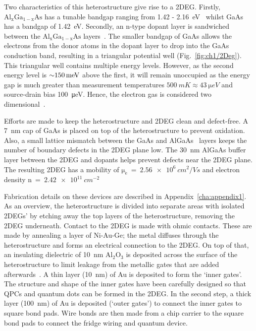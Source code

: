 Two characteristics of this heterostructure give rise to a 2DEG. Firstly, $\mathrm{Al_xGa_{1-x}As}$ has a tunable bandgap ranging from 1.42 - \qty{2.16}{eV}~\cite{gaas_overview} whilst GaAs has a bandgap of \qty{1.42}{eV}. Secondly, an n-type dopant layer is sandwiched between the $\mathrm{Al_xGa_{1-x}As}$ layers~\cite{dopant_layer}. The smaller bandgap of GaAs allows the electrons from the donor atoms in the dopant layer to drop into the GaAs conduction band, resulting in a triangular potential well (Fig.~\ref{fig:ch1/2Deg}). This triangular well contains multiple energy levels. However, as the second energy level is $\qty{\sim 150}{meV}$ above the first, it will remain unoccupied as the energy gap is much greater than measurement temperatures $\qty{500}{mK}\approx\qty{43}{\micro eV}$ and source-drain bias \qty{100}{\micro eV}. Hence, the electron gas is considered two dimensional~\cite{BEENAKKER_1991}.

Efforts are made to keep the heterostructure and 2DEG clean and defect-free. A \qty{7}{nm} cap of GaAs is placed on top of the heterostructure to prevent oxidation. Also, a small lattice mismatch between the GaAs and AlGaAs~\cite{gaas_superlattice} layers keeps the number of boundary defects in the 2DEG plane low. The \qty{30}{nm} AlGaAs buffer layer between the 2DEG and dopants helps prevent defects near the 2DEG plane. The resulting 2DEG has a mobility of $\mathrm{\mu_e}~=~\qty{2.56e6}{cm^2/Vs}$ and electron density $\mathrm{n}~=~\qty{2.42e11}{cm^{-2}}$

Fabrication details on these devices are described in Appendix~\ref{cha:appendix1}. As an overview, the heterostructure is divided into separate areas with isolated 2DEGs' by etching away the top layers of the heterostructure, removing the 2DEG underneath. Contact to the 2DEG is made with ohmic contacts. These are made by annealing a layer of Ni-Au-Ge; the metal diffuses through the heterostructure and forms an electrical connection to the 2DEG. On top of that, an insulating dielectric of \qty{10}{nm} $\mathrm{Al_2O_3}$ is deposited across the surface of the heterostructure to limit leakage from the metallic gates that are added afterwards~\cite{insulating_gates}. A thin layer (\qty{10}{nm}) of Au is deposited to form the `inner gates'. The structure and shape of the inner gates have been carefully designed so that QPCs and quantum dots can be formed in the 2DEG. In the second step, a thick layer (\qty{100}{nm}) of Au is deposited (`outer gates') to connect the inner gates to square bond pads. Wire bonds are then made from a chip carrier to the square bond pads to connect the fridge wiring and quantum device. 




